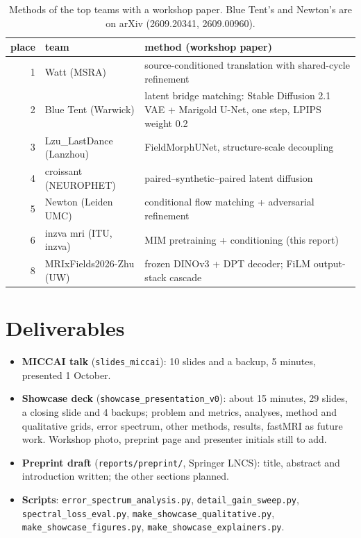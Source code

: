 \documentclass[10pt,a4paper]{article}
\begin{document}
\begin{table}[H]
\centering\small
\begin{tabular}{@{}rlp{10.4cm}@{}}
\toprule
place & team & method (workshop paper) \\
\midrule
1 & Watt (MSRA) & source-conditioned translation with shared-cycle refinement \\
2 & Blue Tent (Warwick) & latent bridge matching: Stable Diffusion 2.1 VAE + Marigold U-Net,
  one step, LPIPS weight 0.2 \\
3 & Lzu\_LastDance (Lanzhou) & FieldMorphUNet, structure-scale decoupling \\
4 & croissant (NEUROPHET) & paired--synthetic--paired latent diffusion \\
5 & Newton (Leiden UMC) & conditional flow matching + adversarial refinement \\
6 & inzva mri (ITU, inzva) & MIM pretraining + conditioning (this report) \\
8 & MRIxFields2026-Zhu (UW) & frozen DINOv3 + DPT decoder; FiLM output-stack cascade \\
\bottomrule
\end{tabular}
\caption{Methods of the top teams with a workshop paper. Blue Tent's and Newton's are on arXiv
(2609.20341, 2609.00960).}
\label{tab:teams}
\end{table}

\section{Deliverables}\label{sec:deliver}

\begin{itemize}
  \item \textbf{MICCAI talk} (\texttt{slides\_miccai}): 10 slides and a backup, 5 minutes,
        presented 1 October.
  \item \textbf{Showcase deck} (\texttt{showcase\_presentation\_v0}): about 15 minutes, 29 slides,
        a closing slide and 4 backups; problem and metrics, analyses, method and qualitative
        grids, error spectrum, other methods, results, fastMRI as future work. Workshop photo,
        preprint page and presenter initials still to add.
  \item \textbf{Preprint draft} (\texttt{reports/preprint/}, Springer LNCS): title, abstract and
        introduction written; the other sections planned.
  \item \textbf{Scripts}: \texttt{error\_spectrum\_analysis.py}, \texttt{detail\_gain\_sweep.py},
        \texttt{spectral\_loss\_eval.py}, \texttt{make\_showcase\_qualitative.py},
        \texttt{make\_showcase\_figures.py}, \texttt{make\_showcase\_explainers.py}.
\end{itemize}
\end{document}
